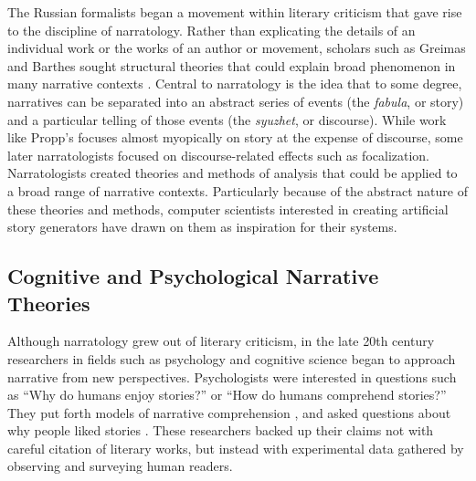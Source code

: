 The Russian formalists began a movement within literary criticism that gave rise to the discipline of narratology.
%
Rather than explicating the details of an individual work or the works of an author or movement, scholars such as Greimas and Barthes sought structural theories that could explain broad phenomenon in many narrative contexts \citep{Barthes1975,Greimas1988}.
%
Central to narratology is the idea that to some degree, narratives can be separated into an abstract series of events (the \textit{fabula}, or story) and a particular telling of those events (the \textit{syuzhet}, or discourse).
%
While work like Propp's focuses almost myopically on story at the expense of discourse, some later narratologists focused on discourse-related effects such as focalization.
%
Narratologists created theories and methods of analysis that could be applied to a broad range of narrative contexts.
%
Particularly because of the abstract nature of these theories and methods, computer scientists interested in creating artificial story generators have drawn on them as inspiration for their systems.


\subsection{Cognitive and Psychological Narrative Theories}

Although narratology grew out of literary criticism, in the late 20th century researchers in fields such as psychology and cognitive science began to approach narrative from new perspectives.
%
Psychologists were interested in questions such as ``Why do humans enjoy stories?'' or ``How do humans comprehend stories?''
%
They put forth models of narrative comprehension \citep{Kintsch1980,Brewer1982}, and asked questions about why people liked stories \citep{Iran-Nejad1987}.
%
These researchers backed up their claims not with careful citation of literary works, but instead with experimental data gathered by observing and surveying human readers.


